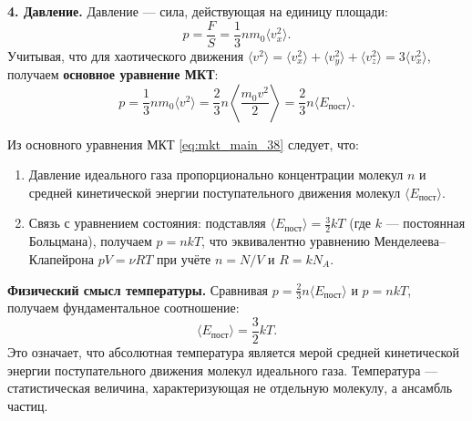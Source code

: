 \begin{theorem}
\textbf{4. Давление.}
Давление --- сила, действующая на единицу площади:
\begin{equation}
    p = \frac{F}{S} = \frac{1}{3} n m_0 \langle v_x^2 \rangle.
\end{equation}
Учитывая, что для хаотического движения $\langle v^2 \rangle = \langle v_x^2 \rangle + \langle v_y^2 \rangle + \langle v_z^2 \rangle = 3\langle v_x^2 \rangle$, получаем \textbf{основное уравнение МКТ}:
\begin{equation}
    p = \frac{1}{3} n m_0 \langle v^2 \rangle = \frac{2}{3} n \left\langle \frac{m_0 v^2}{2} \right\rangle = \frac{2}{3} n \langle E_{\text{пост}} \rangle. \label{eq:mkt_main_38}
\end{equation}
\end{theorem}

\begin{property}
Из основного уравнения МКТ \eqref{eq:mkt_main_38} следует, что:
\begin{enumerate}
    \item Давление идеального газа пропорционально концентрации молекул $n$ и средней кинетической энергии поступательного движения молекул $\langle E_{\text{пост}} \rangle$.
    \item Связь с уравнением состояния: подставляя $\langle E_{\text{пост}} \rangle = \frac{3}{2} kT$ (где $k$ --- постоянная Больцмана), получаем $p = n k T$, что эквивалентно уравнению Менделеева--Клапейрона $pV = \nu RT$ при учёте $n = N/V$ и $R = k N_A$.
\end{enumerate}
\end{property}

\begin{remark}
\textbf{Физический смысл температуры.} Сравнивая $p = \frac{2}{3} n \langle E_{\text{пост}} \rangle$ и $p = n k T$, получаем фундаментальное соотношение:
\begin{equation}
    \langle E_{\text{пост}} \rangle = \frac{3}{2} k T.
\end{equation}
Это означает, что абсолютная температура является мерой средней кинетической энергии поступательного движения молекул идеального газа. Температура --- статистическая величина, характеризующая не отдельную молекулу, а ансамбль частиц.
\end{remark}
